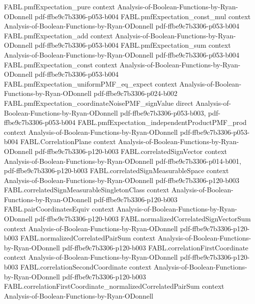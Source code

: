 \begin{theorem}
\proofstep
  {FABL.pmfExpectation_pure}
  {context}
  {Analysis-of-Boolean-Functions-by-Ryan-ODonnell}
  {pdf-ffbe9c7b3306-p053-b004}
\proofstep
  {FABL.pmfExpectation_const_mul}
  {context}
  {Analysis-of-Boolean-Functions-by-Ryan-ODonnell}
  {pdf-ffbe9c7b3306-p053-b004}
\proofstep
  {FABL.pmfExpectation_add}
  {context}
  {Analysis-of-Boolean-Functions-by-Ryan-ODonnell}
  {pdf-ffbe9c7b3306-p053-b004}
\proofstep
  {FABL.pmfExpectation_sum}
  {context}
  {Analysis-of-Boolean-Functions-by-Ryan-ODonnell}
  {pdf-ffbe9c7b3306-p053-b004}
\proofstep
  {FABL.pmfExpectation_const}
  {context}
  {Analysis-of-Boolean-Functions-by-Ryan-ODonnell}
  {pdf-ffbe9c7b3306-p053-b004}
\proofstep
  {FABL.pmfExpectation_uniformPMF_eq_expect}
  {context}
  {Analysis-of-Boolean-Functions-by-Ryan-ODonnell}
  {pdf-ffbe9c7b3306-p024-b002}
\proofstep
  {FABL.pmfExpectation_coordinateNoisePMF_signValue}
  {direct}
  {Analysis-of-Boolean-Functions-by-Ryan-ODonnell}
  {pdf-ffbe9c7b3306-p053-b003,
    pdf-ffbe9c7b3306-p053-b004}
\proofstep
  {FABL.pmfExpectation_independentProductPMF_prod}
  {context}
  {Analysis-of-Boolean-Functions-by-Ryan-ODonnell}
  {pdf-ffbe9c7b3306-p053-b004}
\proofstep
  {FABL.CorrelationPlane}
  {context}
  {Analysis-of-Boolean-Functions-by-Ryan-ODonnell}
  {pdf-ffbe9c7b3306-p120-b003}
\proofstep
  {FABL.correlatedSignVector}
  {context}
  {Analysis-of-Boolean-Functions-by-Ryan-ODonnell}
  {pdf-ffbe9c7b3306-p014-b001,
    pdf-ffbe9c7b3306-p120-b003}
\proofstep
  {FABL.correlatedSignMeasurableSpace}
  {context}
  {Analysis-of-Boolean-Functions-by-Ryan-ODonnell}
  {pdf-ffbe9c7b3306-p120-b003}
\proofstep
  {FABL.correlatedSignMeasurableSingletonClass}
  {context}
  {Analysis-of-Boolean-Functions-by-Ryan-ODonnell}
  {pdf-ffbe9c7b3306-p120-b003}
\proofstep
  {FABL.pairCoordinatesEquiv}
  {context}
  {Analysis-of-Boolean-Functions-by-Ryan-ODonnell}
  {pdf-ffbe9c7b3306-p120-b003}
\proofstep
  {FABL.normalizedCorrelatedSignVectorSum}
  {context}
  {Analysis-of-Boolean-Functions-by-Ryan-ODonnell}
  {pdf-ffbe9c7b3306-p120-b003}
\proofstep
  {FABL.normalizedCorrelatedPairSum}
  {context}
  {Analysis-of-Boolean-Functions-by-Ryan-ODonnell}
  {pdf-ffbe9c7b3306-p120-b003}
\proofstep
  {FABL.correlationFirstCoordinate}
  {context}
  {Analysis-of-Boolean-Functions-by-Ryan-ODonnell}
  {pdf-ffbe9c7b3306-p120-b003}
\proofstep
  {FABL.correlationSecondCoordinate}
  {context}
  {Analysis-of-Boolean-Functions-by-Ryan-ODonnell}
  {pdf-ffbe9c7b3306-p120-b003}
\proofstep
  {FABL.correlationFirstCoordinate_normalizedCorrelatedPairSum}
  {context}
  {Analysis-of-Boolean-Functions-by-Ryan-ODonnell}

\end{theorem}
